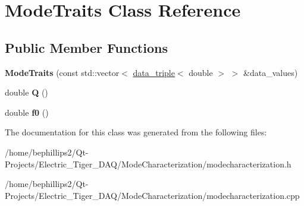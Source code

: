 \hypertarget{class_mode_traits}{}\section{Mode\+Traits Class Reference}
\label{class_mode_traits}
\subsection*{Public Member Functions}
\begin{DoxyCompactItemize}
\item 
{\bfseries Mode\+Traits} (const std\+::vector$<$ \hyperlink{structdata__triple}{data\+\_\+triple}$<$ double $>$ $>$ \&data\+\_\+values)\hypertarget{class_mode_traits_ade9c65b78b5140f3fd2eaabcd38d1837}{}\label{class_mode_traits_ade9c65b78b5140f3fd2eaabcd38d1837}

\item 
double {\bfseries Q} ()\hypertarget{class_mode_traits_a83b44ff9b0e9db253c7cd13b1e51a736}{}\label{class_mode_traits_a83b44ff9b0e9db253c7cd13b1e51a736}

\item 
double {\bfseries f0} ()\hypertarget{class_mode_traits_a903f06c1d611514e42869f6d6b1e387f}{}\label{class_mode_traits_a903f06c1d611514e42869f6d6b1e387f}

\end{DoxyCompactItemize}


The documentation for this class was generated from the following files\+:\begin{DoxyCompactItemize}
\item 
/home/bephillips2/\+Qt-\/\+Projects/\+Electric\+\_\+\+Tiger\+\_\+\+D\+A\+Q/\+Mode\+Characterization/modecharacterization.\+h\item 
/home/bephillips2/\+Qt-\/\+Projects/\+Electric\+\_\+\+Tiger\+\_\+\+D\+A\+Q/\+Mode\+Characterization/modecharacterization.\+cpp\end{DoxyCompactItemize}
